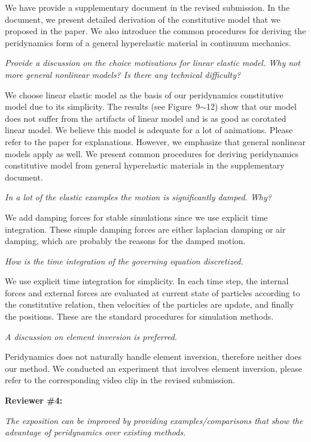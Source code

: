 We have provide a supplementary document in the revised submission. In the document, we present detailed derivation of the constitutive model that we proposed in the paper. We also introduce the common procedures for deriving the peridynamics form of a general hyperelastic material in continuum mechanics.

\emph{Provide a discussion on the choice motivations for linear elastic model. Why not more general nonlinear models? Is there any technical difficulty?}

We choose linear elastic model as the basis of our peridynamics constitutive model due to its simplicity. The results (see Figure~9$\sim$12) show that our model does not suffer from the artifacts of linear model and is as good as corotated linear model. We believe this model is adequate for a lot of animations. Please refer to the paper for explanations. However, we emphasize that general nonlinear models apply as well. We present common procedures for deriving peridynamics constitutive model from general hyperelastic materials in the supplementary document.

\emph{In a lot of the elastic examples the motion is significantly damped. Why?}

We add damping forces for stable simulations since we use explicit time integration. These simple damping forces are either laplacian damping or air damping, which are probably the reasons for the damped motion.

\emph{How is the time integration of the governing equation discretized.}

We use explicit time integration for simplicity. In each time step, the internal forces and external forces are evaluated at current state of particles according to the constitutive relation, then velocities of the particles are update, and finally the positions. These are the standard procedures for simulation methods.

\emph{A discussion on element inversion is preferred.}

Peridynamics does not naturally handle element inversion, therefore neither does our method. We conducted an experiment that involves element inversion, please refer to the corresponding video clip in the revised submission.

\noindent{}\textbf{Reviewer \#4:}

\emph{The exposition can be improved by providing examples/comparisons that show the advantage of peridynamics over existing methods.}

